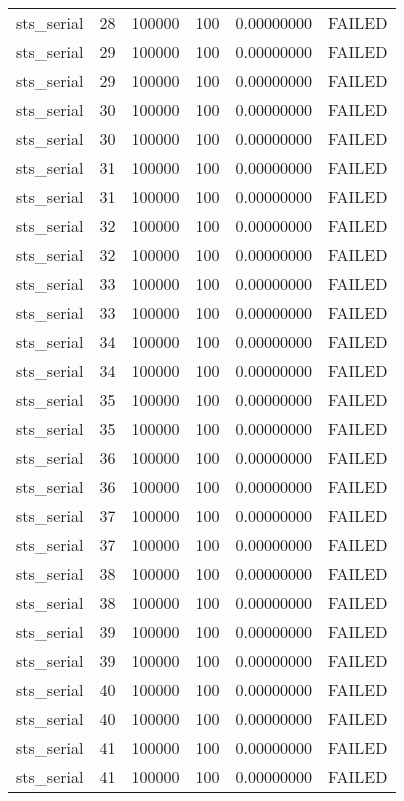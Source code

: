 \begin{longtable}{cccccc}
sts\_serial & 28 & 100000 & 100 & 0.00000000 & FAILED \\
sts\_serial & 29 & 100000 & 100 & 0.00000000 & FAILED \\
sts\_serial & 29 & 100000 & 100 & 0.00000000 & FAILED \\
sts\_serial & 30 & 100000 & 100 & 0.00000000 & FAILED \\
sts\_serial & 30 & 100000 & 100 & 0.00000000 & FAILED \\
sts\_serial & 31 & 100000 & 100 & 0.00000000 & FAILED \\
sts\_serial & 31 & 100000 & 100 & 0.00000000 & FAILED \\
sts\_serial & 32 & 100000 & 100 & 0.00000000 & FAILED \\
sts\_serial & 32 & 100000 & 100 & 0.00000000 & FAILED \\
sts\_serial & 33 & 100000 & 100 & 0.00000000 & FAILED \\
sts\_serial & 33 & 100000 & 100 & 0.00000000 & FAILED \\
sts\_serial & 34 & 100000 & 100 & 0.00000000 & FAILED \\
sts\_serial & 34 & 100000 & 100 & 0.00000000 & FAILED \\
sts\_serial & 35 & 100000 & 100 & 0.00000000 & FAILED \\
sts\_serial & 35 & 100000 & 100 & 0.00000000 & FAILED \\
sts\_serial & 36 & 100000 & 100 & 0.00000000 & FAILED \\
sts\_serial & 36 & 100000 & 100 & 0.00000000 & FAILED \\
sts\_serial & 37 & 100000 & 100 & 0.00000000 & FAILED \\
sts\_serial & 37 & 100000 & 100 & 0.00000000 & FAILED \\
sts\_serial & 38 & 100000 & 100 & 0.00000000 & FAILED \\
sts\_serial & 38 & 100000 & 100 & 0.00000000 & FAILED \\
sts\_serial & 39 & 100000 & 100 & 0.00000000 & FAILED \\
sts\_serial & 39 & 100000 & 100 & 0.00000000 & FAILED \\
sts\_serial & 40 & 100000 & 100 & 0.00000000 & FAILED \\
sts\_serial & 40 & 100000 & 100 & 0.00000000 & FAILED \\
sts\_serial & 41 & 100000 & 100 & 0.00000000 & FAILED \\
sts\_serial & 41 & 100000 & 100 & 0.00000000 & FAILED \\

\end{longtable}

